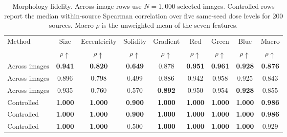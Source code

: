 \begin{table}[t]
\centering
\caption{Morphology fidelity. Across-image rows use $N=1{,}000$ selected images. Controlled rows report the median within-source Spearman correlation over five same-seed dose levels for 200 sources. Macro $\rho$ is the unweighted mean of the seven features.}
\label{tab:morphology}
\small
\begin{tabular*}{\textwidth}{@{\extracolsep{\fill}}lcccccccc@{}}
\toprule
Method & Size & Eccentricity & Solidity & Gradient & Red & Green & Blue & Macro \\
 & $\rho\uparrow$ & $\rho\uparrow$ & $\rho\uparrow$ & $\rho\uparrow$ & $\rho\uparrow$ & $\rho\uparrow$ & $\rho\uparrow$ & $\rho\uparrow$ \\
\midrule
Across images \cellvit{} & \textbf{0.941} & \textbf{0.820} & \textbf{0.649} & 0.878 & \textbf{0.951} & \textbf{0.961} & \textbf{0.928} & \textbf{0.876} \\
Across images \hovernet{} & 0.896 & 0.798 & 0.499 & 0.886 & 0.942 & 0.958 & 0.925 & 0.843 \\
Across images \stardist{} & 0.935 & 0.760 & 0.570 & \textbf{0.892} & 0.950 & 0.954 & \textbf{0.928} & 0.855 \\
\midrule
Controlled \cellvit{} & \textbf{1.000} & \textbf{1.000} & \textbf{0.900} & \textbf{1.000} & \textbf{1.000} & \textbf{1.000} & \textbf{1.000} & \textbf{0.986} \\
Controlled \hovernet{} & \textbf{1.000} & \textbf{1.000} & \textbf{0.900} & \textbf{1.000} & \textbf{1.000} & \textbf{1.000} & \textbf{1.000} & \textbf{0.986} \\
Controlled \stardist{} & \textbf{1.000} & \textbf{1.000} & 0.500 & \textbf{1.000} & \textbf{1.000} & \textbf{1.000} & \textbf{1.000} & 0.929 \\
\bottomrule
\end{tabular*}
\end{table}


